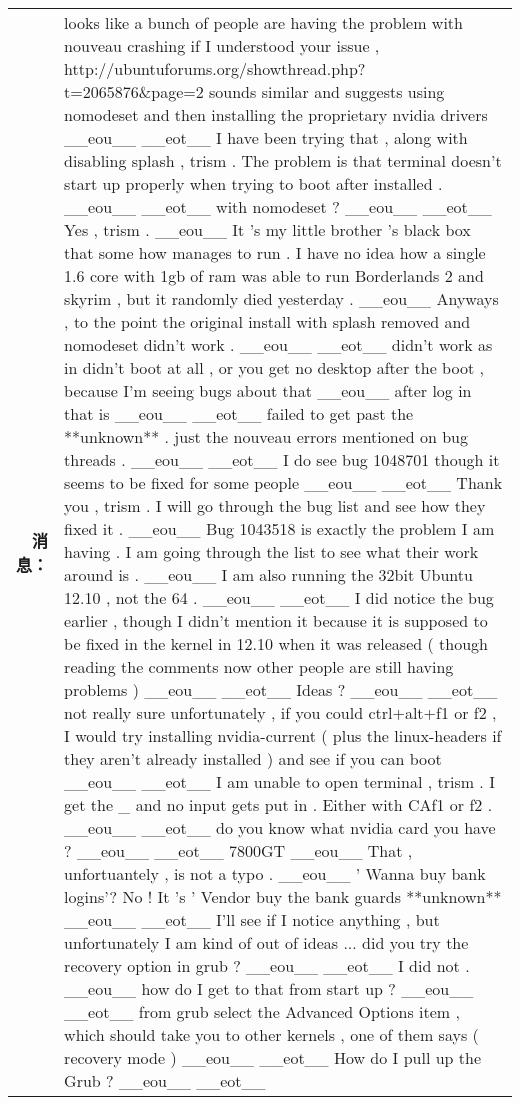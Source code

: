 \begin{tabularx}{0.8\textwidth}{@{}rX@{}}
\textbf{消息：}&looks like a bunch of people are having the problem with nouveau crashing if I understood your issue , http://ubuntuforums.org/showthread.php?t=2065876\&page=2 sounds similar and suggests using nomodeset and then installing the proprietary nvidia drivers \_\_eou\_\_ \_\_eot\_\_ I have been trying that , along with disabling splash , trism . The problem is that terminal doesn't start up properly when trying to boot after installed . \_\_eou\_\_ \_\_eot\_\_ with nomodeset ? \_\_eou\_\_ \_\_eot\_\_ Yes , trism . \_\_eou\_\_ It 's my little brother 's black box that some how manages to run . I have no idea how a single 1.6 core with 1gb of ram was able to run Borderlands 2 and skyrim , but it randomly died yesterday . \_\_eou\_\_ Anyways , to the point the original install with splash removed and nomodeset didn't work . \_\_eou\_\_ \_\_eot\_\_ didn't work as in didn't boot at all , or you get no desktop after the boot , because I'm seeing bugs about that \_\_eou\_\_ after log in that is \_\_eou\_\_ \_\_eot\_\_ failed to get past the **unknown** . just the nouveau errors mentioned on bug threads . \_\_eou\_\_ \_\_eot\_\_ I do see bug 1048701 though it seems to be fixed for some people \_\_eou\_\_ \_\_eot\_\_ Thank you , trism . I will go through the bug list and see how they fixed it . \_\_eou\_\_ Bug 1043518 is exactly the problem I am having . I am going through the list to see what their work around is . \_\_eou\_\_ I am also running the 32bit Ubuntu 12.10 , not the 64 . \_\_eou\_\_ \_\_eot\_\_ I did notice the bug earlier , though I didn't mention it because it is supposed to be fixed in the kernel in 12.10 when it was released ( though reading the comments now other people are still having problems ) \_\_eou\_\_ \_\_eot\_\_ Ideas ? \_\_eou\_\_ \_\_eot\_\_ not really sure unfortunately , if you could ctrl+alt+f1 or f2 , I would try installing nvidia{-}current ( plus the linux{-}headers if they aren't already installed ) and see if you can boot \_\_eou\_\_ \_\_eot\_\_ I am unable to open terminal , trism . I get the \_ and no input gets put in . Either with CAf1 or f2 . \_\_eou\_\_ \_\_eot\_\_ do you know what nvidia card you have ? \_\_eou\_\_ \_\_eot\_\_ 7800GT \_\_eou\_\_ That , unfortuantely , is not a typo . \_\_eou\_\_ ' Wanna buy bank logins'? No ! It 's ' Vendor buy the bank guards **unknown** \_\_eou\_\_ \_\_eot\_\_ I'll see if I notice anything , but unfortunately I am kind of out of ideas ... did you try the recovery option in grub ? \_\_eou\_\_ \_\_eot\_\_ I did not . \_\_eou\_\_ how do I get to that from start up ? \_\_eou\_\_ \_\_eot\_\_ from grub select the Advanced Options item , which should take you to other kernels , one of them says ( recovery mode ) \_\_eou\_\_ \_\_eot\_\_ How do I pull up the Grub ? \_\_eou\_\_ \_\_eot\_\_\\%

\end{tabularx}
